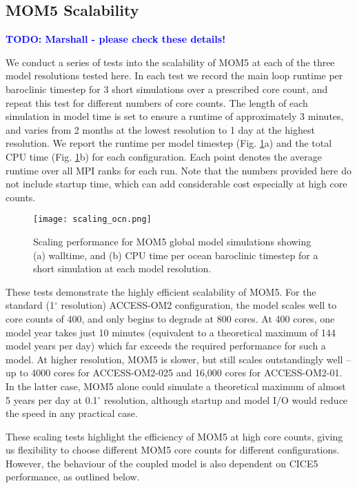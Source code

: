 \documentclass[gmd, manuscript]{copernicus}
\newcommand{\TODO}[1]{\textcolor{blue}{\textsf{\textbf{TODO: #1}}}}
\begin{document}
\subsection{MOM5 Scalability}
\TODO{Marshall - please check these details! }

We conduct a series of tests into the scalability of MOM5 at each of the three model resolutions tested here.
In each test we record the main loop runtime per baroclinic timestep for 3 short simulations over a prescribed core count, and repeat this test for different numbers of core counts.
The length of each simulation in model time is set to ensure a runtime of approximately 3 minutes, and varies from 2 months at the lowest resolution to 1 day at the highest resolution.
We report the runtime per model timestep (Fig. \ref{fig:scaling_ocn}a) and the total CPU time (Fig. \ref{fig:scaling_ocn}b) for each configuration.
Each point denotes the average runtime over all MPI ranks for each run.
Note that the numbers provided here do not include startup time, which can add considerable cost especially at high core counts.

\begin{figure}[t]
\texttt{[image: scaling\_ocn.png]}
\caption{Scaling performance for MOM5 global model simulations showing (a) walltime, and (b) CPU time per ocean baroclinic timestep for a short simulation at each model resolution. \label{fig:scaling_ocn}}
\end{figure}

These tests demonstrate the highly efficient scalability of MOM5. 
For the standard (1$^\circ$ resolution) ACCESS-OM2 configuration, the model scales well to core counts of 400, and only begins to degrade at 800 cores.
At 400 cores, one model year takes just 10 minutes (equivalent to a theoretical maximum of 144 model years per day) which far exceeds the required performance for such a model.
At higher resolution, MOM5 is slower, but still scales outstandingly well -- up to 4000 cores for ACCESS-OM2-025 and 16,000 cores for ACCESS-OM2-01.
In the latter case, MOM5 alone could simulate a theoretical maximum of almost 5 years per day at 0.1$^\circ$ resolution, although startup and model I/O would reduce the speed in any practical case.

These scaling tests highlight the efficiency of MOM5 at high core counts, giving us flexibility to choose different MOM5 core counts for different configurations.
However, the behaviour of the coupled model is also dependent on CICE5 performance, as outlined below.
\end{document}
